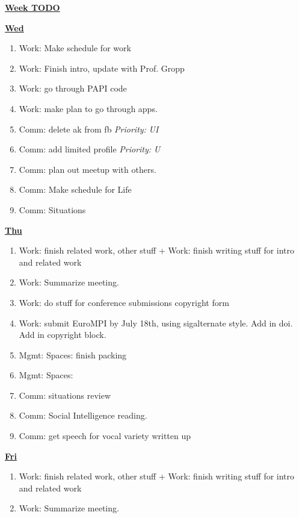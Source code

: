 \documentclass[serif,mathserif,final]{beamer}
\newcommand{\priority}[1]{\textit{Priority:} \textit{#1}}
\begin{document}
\begin{frame}{}
\begin{columns}[t]
\begin{column}{0.33\linewidth}{\textbf{\underline{Week TODO}}}
\begin{block}
\textbf{\underline{Wed}}
\begin{enumerate} 
\item \tiny Work: Make schedule for work 
\item \tiny Work: Finish intro, update with Prof. Gropp 
\item \tiny Work: go through PAPI code 
\item \tiny Work: make plan to go through apps. 

\item \tiny Comm: delete ak from fb \priority{UI}  
\item \tiny Comm: add limited profile \priority{U} 

\item \tiny Comm: plan out meetup with others. 
\item \tiny Comm: Make schedule for Life 
\item \tiny Comm: Situations 

\end{enumerate} 

\textbf{\underline{Thu}}
\begin{enumerate} 
\tiny \item \tiny Work: finish related work, other stuff + Work: finish writing stuff for intro and related work 
\item \tiny Work: Summarize meeting. 

\item \tiny Work: do stuff for conference submissions copyright form  
\item \tiny Work: submit EuroMPI by July 18th, using sigalternate style. Add in doi. Add in copyright block. 

\item \tiny Mgmt: Spaces: finish packing 
\item \tiny Mgmt: Spaces: 

\item \tiny Comm: situations review 
\item \tiny Comm: Social Intelligence reading. 

\item \tiny Comm: get speech for vocal variety written up 

\end{enumerate} 

\textbf{\underline{Fri}}

\begin{enumerate} 

\tiny \item \tiny Work: finish related work, other stuff + Work: finish writing stuff for intro and related work 
\item \tiny Work: Summarize meeting. 


\end{enumerate}
\end{block}
\end{column}
\end{columns}
\end{frame}
\end{document}

